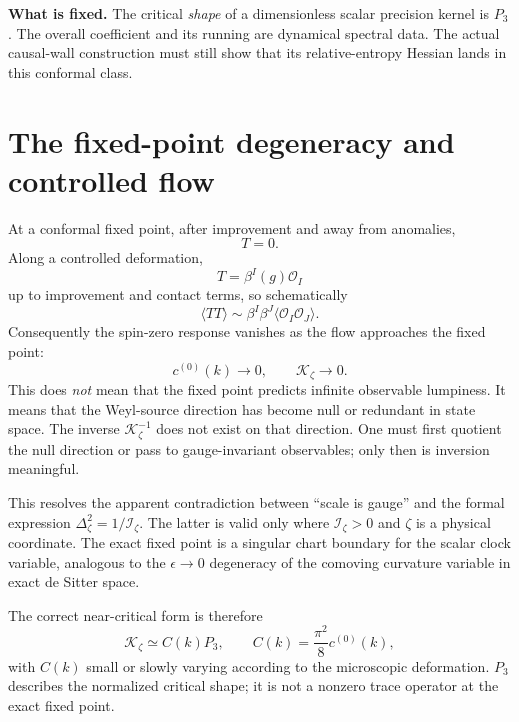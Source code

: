 \documentclass[11pt]{article}
\numberwithin{equation}{section}
\newcommand{\Iz}{\mathcal I_\zeta}
\newcommand{\Kz}{\mathcal K_\zeta}
\newcommand{\cz}{c^{(0)}}
\newcommand{\Order}{\mathcal O}
\theoremstyle{definition}
\theoremstyle{remark}
\begin{document}
\begin{resultbox}
\textbf{What is fixed.} The critical \emph{shape} of a dimensionless scalar precision kernel is $P_3$. The overall coefficient and its running are dynamical spectral data. The actual causal-wall construction must still show that its relative-entropy Hessian lands in this conformal class.
\end{resultbox}

\section{The fixed-point degeneracy and controlled flow}
\label{sec:fixedpoint}

At a conformal fixed point, after improvement and away from anomalies,
\begin{equation}
T=0.
\end{equation}
Along a controlled deformation,
\begin{equation}
T=\beta^I(g)\Order_I
\end{equation}
up to improvement and contact terms, so schematically
\begin{equation}
\langle TT\rangle
\sim \beta^I\beta^J\langle\Order_I\Order_J\rangle.
\end{equation}
Consequently the spin-zero response vanishes as the flow approaches the fixed point:
\begin{equation}
\cz(k)\longrightarrow0,
\qquad
\Kz\longrightarrow0.
\end{equation}
This does \emph{not} mean that the fixed point predicts infinite observable lumpiness. It means that the Weyl-source direction has become null or redundant in state space. The inverse $\Kz^{-1}$ does not exist on that direction. One must first quotient the null direction or pass to gauge-invariant observables; only then is inversion meaningful.

This resolves the apparent contradiction between ``scale is gauge'' and the formal expression $\Delta_\zeta^2=1/\Iz$. The latter is valid only where $\Iz>0$ and $\zeta$ is a physical coordinate. The exact fixed point is a singular chart boundary for the scalar clock variable, analogous to the $\epsilon\to0$ degeneracy of the comoving curvature variable in exact de Sitter space.

The correct near-critical form is therefore
\begin{equation}
\Kz\simeq C(k)P_3,
\qquad
C(k)=\frac{\pi^2}{8}\cz(k),
\end{equation}
with $C(k)$ small or slowly varying according to the microscopic deformation. $P_3$ describes the normalized critical shape; it is not a nonzero trace operator at the exact fixed point.
\end{document}
